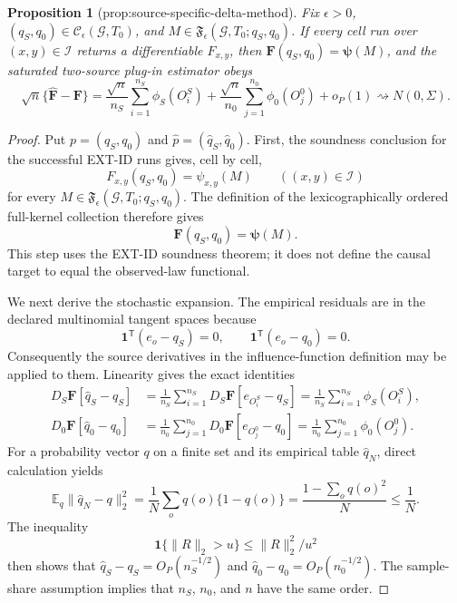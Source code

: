 \documentclass{article}
\newtheorem{proposition}{Proposition}
\begin{document}
\begin{proposition}[prop:source-specific-delta-method]\label{prop:source-specific-delta-method}
Fix \(\epsilon>0\), \((q_S,q_0)\in\mathcal C_{\epsilon}(\mathcal G,T_0)\), and \(M\in\mathfrak F_{\epsilon}(\mathcal G,T_0;q_S,q_0)\). If every cell run over \((x,y)\in\mathcal I\) returns a differentiable \(F_{x,y}\), then \(\mathbf F(q_S,q_0)=\boldsymbol\psi(M)\), and the saturated two-source plug-in estimator obeys \[\sqrt n\{\widehat{\mathbf F}-\mathbf F\}=\frac{\sqrt n}{n_S}\sum_{i=1}^{n_S}\phi_S(O_i^S)+\frac{\sqrt n}{n_0}\sum_{j=1}^{n_0}\phi_0(O_j^0)+o_P(1)\rightsquigarrow N(0,\Sigma).\]
\end{proposition}
\begin{proof}
Put \(p=(q_S,q_0)\) and \(\widehat p=(\widehat q_S,\widehat q_0)\).  First, the soundness conclusion for the successful EXT-ID runs gives, cell by cell,
\[
F_{x,y}(q_S,q_0)=\psi_{x,y}(M)
\qquad ((x,y)\in\mathcal I)
\]
for every \(M\in\mathfrak F_{\epsilon}(\mathcal G,T_0;q_S,q_0)\).  The definition of the lexicographically ordered full-kernel collection therefore gives
\[
\mathbf F(q_S,q_0)=\boldsymbol\psi(M).
\]
This step uses the EXT-ID soundness theorem; it does not define the causal target to equal the observed-law functional.

We next derive the stochastic expansion.  The empirical residuals are in the declared multinomial tangent spaces because
\[
\mathbf 1^{\mathsf T}(e_o-q_S)=0,
\qquad
\mathbf 1^{\mathsf T}(e_o-q_0)=0.
\]
Consequently the source derivatives in the influence-function definition may be applied to them.  Linearity gives the exact identities
\[
\begin{aligned}
D_S\mathbf F[\widehat q_S-q_S]
&=\frac1{n_S}\sum_{i=1}^{n_S}
D_S\mathbf F[e_{O_i^S}-q_S]
=\frac1{n_S}\sum_{i=1}^{n_S}\phi_S(O_i^S),\\
D_0\mathbf F[\widehat q_0-q_0]
&=\frac1{n_0}\sum_{j=1}^{n_0}
D_0\mathbf F[e_{O_j^0}-q_0]
=\frac1{n_0}\sum_{j=1}^{n_0}\phi_0(O_j^0).
\end{aligned}
\]
For a probability vector \(q\) on a finite set and its empirical table \(\widehat q_N\), direct calculation yields
\[
\mathbb E_q\|\widehat q_N-q\|_2^2
=\frac1N\sum_o q(o)\{1-q(o)\}
=\frac{1-\sum_o q(o)^2}{N}\le \frac1N.
\]
The inequality
\[
\mathbf 1\{\|R\|_2>u\}\le \|R\|_2^2/u^2
\]
then shows that \(\widehat q_S-q_S=O_P(n_S^{-1/2})\) and \(\widehat q_0-q_0=O_P(n_0^{-1/2})\).  The sample-share assumption implies that \(n_S\), \(n_0\), and \(n\) have the same order.


\end{proof}
\end{document}
